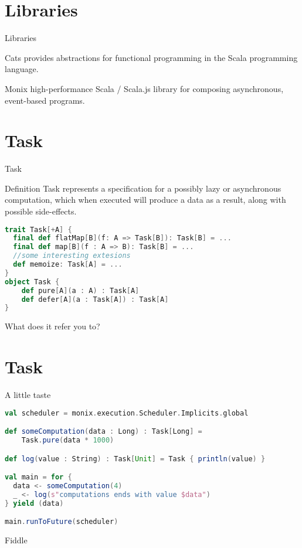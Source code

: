 \documentclass[presentation]{beamer}
\let\oldcite\cite
\renewcommand{\cite}[1]{{\color{blue}\oldcite{#1}}}
\begin{document}
\section{Libraries}
\begin{frame}[fragile]{Libraries}
\begin{block}{Cats \href{https://typelevel.org/cats/}{\faExternalLink} \cite{scalacats2017}}
  provides abstractions for functional programming in the Scala programming language.
\end{block}
\begin{block}{Monix \href{https://monix.io/}{\faExternalLink}}
  high-performance Scala / Scala.js library for composing asynchronous, event-based programs.
\end{block}
\end{frame}
\section{Task}
\begin{frame}[fragile]{Task}
\begin{block}{Definition}
  Task represents a specification for a possibly lazy or asynchronous computation, which when executed will produce a data as a result, along with possible side-effects.
\end{block}
\begin{lstlisting}[language=Scala]
trait Task[+A] {
  final def flatMap[B](f: A => Task[B]): Task[B] = ...
  final def map[B](f : A => B): Task[B] = ...
  //some interesting extesions
  def memoize: Task[A] = ...
}
object Task {
    def pure[A](a : A) : Task[A]
    def defer[A](a : Task[A]) : Task[A]
}
\end{lstlisting}
\begin{center}
  What does it refer you to?
\end{center}
\end{frame}
\section{Task}
\begin{frame}[fragile]{A little taste}

\begin{lstlisting}[language=Scala]
val scheduler = monix.execution.Scheduler.Implicits.global

def someComputation(data : Long) : Task[Long] = 
    Task.pure(data * 1000)

def log(value : String) : Task[Unit] = Task { println(value) }

val main = for {
  data <- someComputation(4)
  _ <- log(s"computations ends with value $data")
} yield (data)

main.runToFuture(scheduler)
\end{lstlisting}
\begin{center}
Fiddle \href{https://scalafiddle.io/sf/C4Qon6a/1}{\faExternalLink}
\end{center}
\end{frame}
\end{document}
